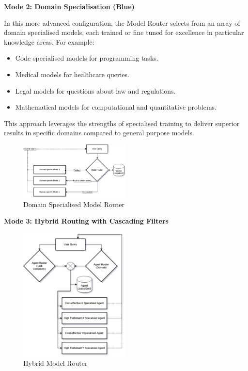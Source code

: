 \textbf{Mode 2: Domain Specialisation (Blue)} 

In this more advanced configuration, the Model Router selects from an array of domain specialised models, each trained or fine tuned for excellence in particular knowledge areas. For example:

\begin{itemize}
    \item Code specialised models for programming tasks.
    \item Medical models for healthcare queries.
    \item Legal models for questions about law and regulations.
    \item Mathematical models for computational and quantitative problems.
\end{itemize}

This approach leverages the strengths of specialised training to deliver superior results in specific domains compared to general purpose models.

\begin{figure}[H]
    \centering
    \includegraphics[width=0.5\textwidth]{figures/model-router.drawio.png}
    \caption{Domain Specialised Model Router}
    \label{fig:domain_specialised_model_router}
\end{figure}

\textbf{Mode 3: Hybrid Routing with Cascading Filters}

\begin{figure}[H]
    \centering
    \includegraphics[width=0.5\textwidth]{figures/hybrid-agent-router.drawio.png}
    \caption{Hybrid Model Router}
    \label{fig:hybrid_model_router}
\end{figure}

